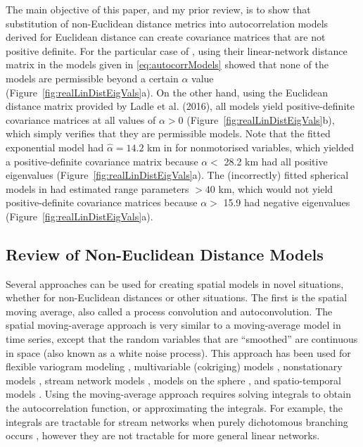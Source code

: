 \documentclass[11pt, titlepage]{article}\usepackage[]{graphicx}\usepackage[]{color}
\begin{document}
\begin{spacing}{1.9}
\begin{flushleft}
The main objective of this paper, and my prior review, is to show that substitution of non-Euclidean distance metrics into autocorrelation models derived for Euclidean distance can create covariance matrices that are not positive definite. For the particular case of \citet{Ladl:Avga:Whea:Boyc:pred:2016}, using their linear-network distance matrix in the models given in \ref{eq:autocorrModels} showed that none of the models are permissible beyond a certain $\alpha$ value (Figure~\ref{fig:realLinDistEigVals}a).  On the other hand, using the Euclidean distance matrix provided by Ladle et al. (2016), all models yield positive-definite covariance matrices at all values of $\alpha > 0$ (Figure~\ref{fig:realLinDistEigVals}b), which simply verifies that they are permissible models.  Note that the fitted exponential model had $\hat{\alpha} = 14.2$ km in \citet{Ladl:Avga:Whea:Boyc:pred:2016} for nonmotorised variables, which yielded a positive-definite covariance matrix because $\alpha <$ 28.2 km had all positive eigenvalues (Figure~\ref{fig:realLinDistEigVals}a). The (incorrectly) fitted spherical models in \citet{Ladl:Avga:Whea:Boyc:pred:2016} \citep[see][]{Ladl:Avga:Whea:Boyc:corr:2017} had estimated range parameters $>40$ km, which would not yield positive-definite covariance matrices because $\alpha >$ 15.9 had negative eigenvalues (Figure~\ref{fig:realLinDistEigVals}a).

\subsection*{Review of Non-Euclidean Distance Models}

Several approaches can be used for creating spatial models in novel situations, whether for non-Euclidean distances or other situations.  The first is the spatial moving average, also called a process convolution and autoconvolution.  The spatial moving-average approach is very similar to a moving-average model in time series, except that the random variables that are ``smoothed'' are continuous in space (also known as a white noise process).  This approach has been used for flexible variogram modeling \citep{Barr:Ver:blac:1996}, multivariable (cokriging) models \citep{Ver:Barr:cons:1998,Ver:Cres:Barr:flex:2004}, nonstationary models \citep{Higd:proc:1998,Higd:Swal:Kern:non-:1999}, stream network models \citep{Ver:Pete:Theo:spat:2006, Cres:Frey:Harc:Smit:spat:2006, Ver:Pete:Move:2010}, models on the sphere \citep{Gnei:stri:2013}, and spatio-temporal models \citep{Wikl:kern:2002,Conn:John:Ver:spat:2015}. Using the moving-average approach requires solving integrals to obtain the autocorrelation function, or approximating the integrals. For example, the integrals are tractable for stream networks when purely dichotomous branching occurs \citep{Ver:Pete:Theo:spat:2006}, however they are not tractable for more general linear networks. 


\end{flushleft}
\end{spacing}
\end{document}
